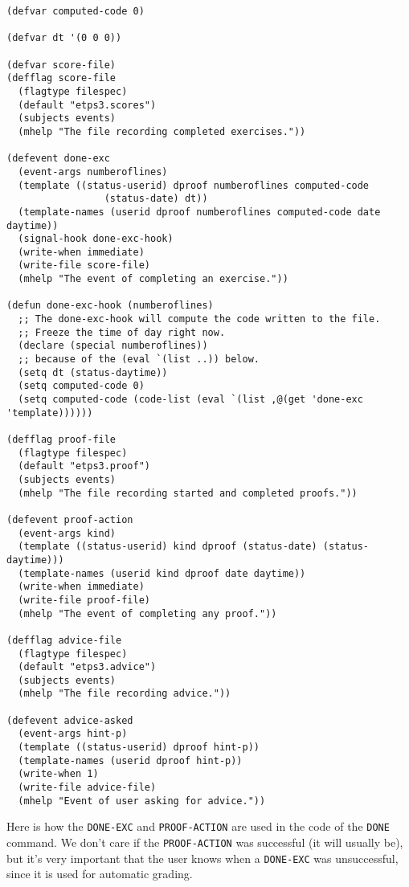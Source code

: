 \begin{verbatim}
(defvar computed-code 0)

(defvar dt '(0 0 0)) 

(defvar score-file)
(defflag score-file
  (flagtype filespec)
  (default "etps3.scores")
  (subjects events)
  (mhelp "The file recording completed exercises."))

(defevent done-exc
  (event-args numberoflines)
  (template ((status-userid) dproof numberoflines computed-code
			     (status-date) dt))
  (template-names (userid dproof numberoflines computed-code date daytime))
  (signal-hook done-exc-hook)
  (write-when immediate)
  (write-file score-file)
  (mhelp "The event of completing an exercise."))

(defun done-exc-hook (numberoflines)
  ;; The done-exc-hook will compute the code written to the file.
  ;; Freeze the time of day right now.
  (declare (special numberoflines))
  ;; because of the (eval `(list ..)) below.
  (setq dt (status-daytime))
  (setq computed-code 0)
  (setq computed-code (code-list (eval `(list ,@(get 'done-exc 'template))))))

(defflag proof-file
  (flagtype filespec)
  (default "etps3.proof")
  (subjects events)
  (mhelp "The file recording started and completed proofs."))

(defevent proof-action
  (event-args kind)
  (template ((status-userid) kind dproof (status-date) (status-daytime)))
  (template-names (userid kind dproof date daytime))
  (write-when immediate)
  (write-file proof-file)
  (mhelp "The event of completing any proof."))

(defflag advice-file
  (flagtype filespec)
  (default "etps3.advice")
  (subjects events)
  (mhelp "The file recording advice."))

(defevent advice-asked
  (event-args hint-p)
  (template ((status-userid) dproof hint-p))
  (template-names (userid dproof hint-p))
  (write-when 1)
  (write-file advice-file)
  (mhelp "Event of user asking for advice."))

\end{verbatim}

Here is how the {\tt DONE-EXC} and {\tt PROOF-ACTION} are used in the code of
the {\tt DONE} command.  We don't care if the {\tt PROOF-ACTION} was successful
(it will usually be), but it's very important that the user knows
when a {\tt DONE-EXC} was unsuccessful, since it is used for automatic
grading.

